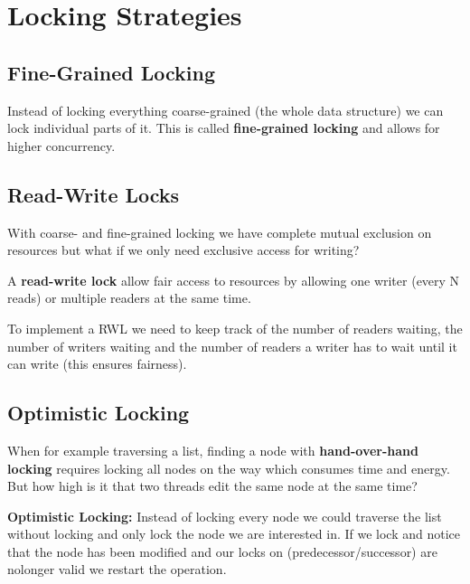 \section{Locking Strategies} 

\subsection{Fine-Grained Locking}

\begin{remark}
    Instead of locking everything coarse-grained (the whole data structure) we can lock individual parts of it. This is called \textbf{fine-grained locking} and allows for higher concurrency.
\end{remark}

\subsection{Read-Write Locks}

\begin{remark}
    With coarse- and fine-grained locking we have complete mutual exclusion on resources but what if we only need exclusive access for writing?
\end{remark}

\begin{definition}
    A \textbf{read-write lock} allow fair access to resources by allowing one writer (every N reads) or multiple readers at the same time.
\end{definition}

\begin{remark}
    To implement a RWL we need to keep track of the number of readers waiting, the number of writers waiting and the number of readers a writer has to wait until it can write (this ensures fairness).
\end{remark}

\subsection{Optimistic Locking}

\begin{remark}
    When for example traversing a list, finding a node with \textbf{hand-over-hand locking} requires locking all nodes on the way which consumes time and energy. But how high is it that two threads edit the same node at the same time? 
\end{remark}

\begin{definition}
    \textbf{Optimistic Locking: } Instead of locking every node we could traverse the list without locking and only lock the node we are interested in. If we lock and notice that the node has been modified and our locks on (predecessor/successor) are nolonger valid we restart the operation.
\end{definition}


